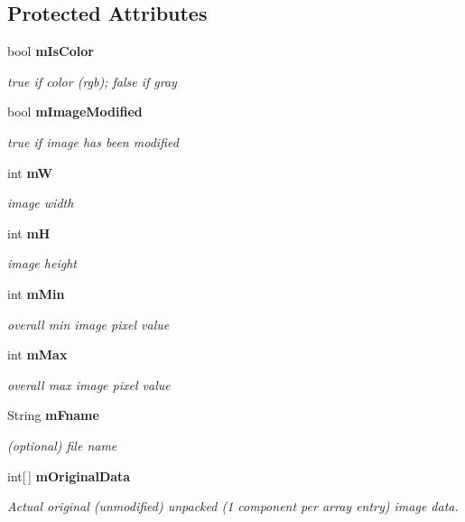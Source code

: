 \subsection*{Protected Attributes}
\begin{CompactItemize}
\item 
bool {\bf m\-Is\-Color}
\begin{CompactList}\small\item\em true if color (rgb); false if gray \item\end{CompactList}\item 
bool {\bf m\-Image\-Modified}
\begin{CompactList}\small\item\em true if image has been modified \item\end{CompactList}\item 
int {\bf m\-W}
\begin{CompactList}\small\item\em image width \item\end{CompactList}\item 
int {\bf m\-H}
\begin{CompactList}\small\item\em image height \item\end{CompactList}\item 
int {\bf m\-Min}
\begin{CompactList}\small\item\em overall min image pixel value \item\end{CompactList}\item 
int {\bf m\-Max}
\begin{CompactList}\small\item\em overall max image pixel value \item\end{CompactList}\item 
String {\bf m\-Fname}
\begin{CompactList}\small\item\em (optional) file name \item\end{CompactList}\item 
int[$\,$] {\bf m\-Original\-Data}
\begin{CompactList}\small\item\em Actual original (unmodified) unpacked (1 component per array entry) image data. \item\end{CompactList}\end{CompactItemize}


